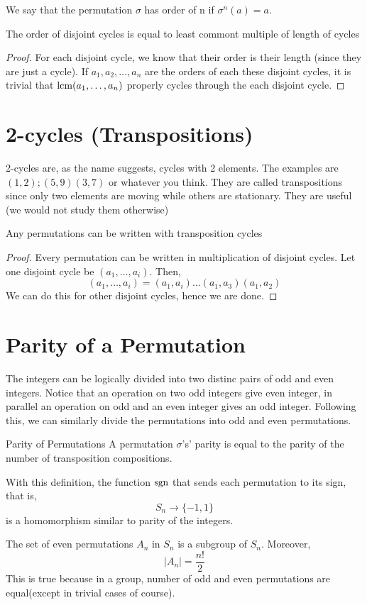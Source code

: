 \begin{definition}
    We say that the permutation $\sigma$ has \alert{order of n} if $\sigma^n(a) = a$.
\end{definition}
\begin{theorem}
    The order of disjoint cycles is equal to least commont multiple of length of cycles
    \begin{proof}
        For each disjoint cycle, we know that their order is their length (since they are just a cycle). If $a_1,a_2,\ldots,a_n$ are the
        orders of each these disjoint cycles, it is trivial that $\operatorname{lcm}(a_1,\ldots,a_n)$ properly cycles through the each disjoint cycle.
    \end{proof}
\end{theorem}
\section{2-cycles (Transpositions)}
2-cycles are, as the name suggests, cycles with 2 elements. The examples are $(1,2); (5,9) (3,7)$ or whatever you think. They are called
\alert{transpositions} since only two elements are moving while others are stationary. They are useful (we would not study them otherwise)
\begin{theorem}
    Any permutations can be written with transposition cycles
    \begin{proof}
        Every permutation can be written in multiplication of disjoint cycles. Let one disjoint cycle be $(a_1,\ldots,a_i)$. Then,
        \[ (a_1, \ldots, a_i) = (a_1,a_i) \ldots (a_1,a_3)(a_1,a_2)\]
        We can do this for other disjoint cycles, hence we are done.
    \end{proof}
\end{theorem}
\section{Parity of a Permutation}
The integers can be logically divided into two distinc pairs of odd and even integers. Notice that an operation on two odd integers give
even integer, in parallel an operation on odd and an even integer gives an odd integer. Following this, we can similarly divide the
permutations into \alert{odd and even} permutations.
\begin{definition}{Parity of Permutations}
    A permutation $\sigma$'s' parity is equal to the parity of the number of transposition compositions.
\end{definition}
With this definition, the function $\operatorname{sgn}$ that sends each permutation to its sign, that is,
\[ S_n \to \{-1, 1\}\]
is a homomorphism similar to parity of the integers.
\begin{theorem}
    The set of even permutations $A_n$ in $S_n$ is a subgroup of $S_n$. Moreover,
    \[ |A_n| = \frac{n!}{2}\]
    This is true because in a group, number of odd and even permutations are equal(except in trivial cases of course).
\end{theorem}
